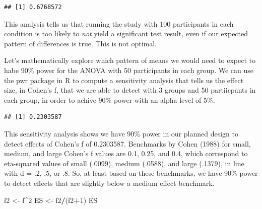 \documentclass[]{book}
\newenvironment{Shaded}{\begin{snugshade}}{\end{snugshade}}
\newcommand{\CommentTok}[1]{\textcolor[rgb]{0.56,0.35,0.01}{\textit{#1}}}
\newcommand{\DataTypeTok}[1]{\textcolor[rgb]{0.13,0.29,0.53}{#1}}
\newcommand{\DecValTok}[1]{\textcolor[rgb]{0.00,0.00,0.81}{#1}}
\newcommand{\FloatTok}[1]{\textcolor[rgb]{0.00,0.00,0.81}{#1}}
\newcommand{\KeywordTok}[1]{\textcolor[rgb]{0.13,0.29,0.53}{\textbf{#1}}}
\newcommand{\NormalTok}[1]{#1}
\newcommand{\OperatorTok}[1]{\textcolor[rgb]{0.81,0.36,0.00}{\textbf{#1}}}
\newcommand{\StringTok}[1]{\textcolor[rgb]{0.31,0.60,0.02}{#1}}
\begin{document}
\begin{verbatim}
## [1] 0.6768572
\end{verbatim}

This analysis tells us that running the study with 100 participants in each condition is too likely to \emph{not} yield a significant test result, even if our expected pattern of differences is true. This is not optimal.

Let's mathematically explore which pattern of means we would need to expect to habe 90\% power for the ANOVA with 50 participants in each group. We can use the pwr package in R to compute a sensitivity analysis that tells us the effect size, in Cohen's f, that we are able to detect with 3 groups and 50 partiicpants in each group, in order to achive 90\% power with an alpha level of 5\%.

\begin{Shaded}
\end{Shaded}

\begin{verbatim}
## [1] 0.2303587
\end{verbatim}

This sensitivity analysis shows we have 90\% power in our planned design to detect effects of Cohen's f of 0.2303587. Benchmarks by Cohen (1988) for small, medium, and large Cohen's f values are 0.1, 0.25, and 0.4, which correspond to eta-squared values of small (.0099), medium (.0588), and large (.1379), in line with d = .2, .5, or .8. So, at least based on these benchmarks, we have 90\% power to detect effects that are slightly below a medium effect benchmark.

\begin{Shaded}
\begin{Highlighting}[]
\NormalTok{f2 <-}\StringTok{ }\NormalTok{f}\OperatorTok{^}\DecValTok{2}
\NormalTok{ES <-}\StringTok{ }\NormalTok{f2}\OperatorTok{/}\NormalTok{(f2}\OperatorTok{+}\DecValTok{1}\NormalTok{)}
\NormalTok{ES}
\end{Highlighting}
\end{Shaded}
\end{document}
